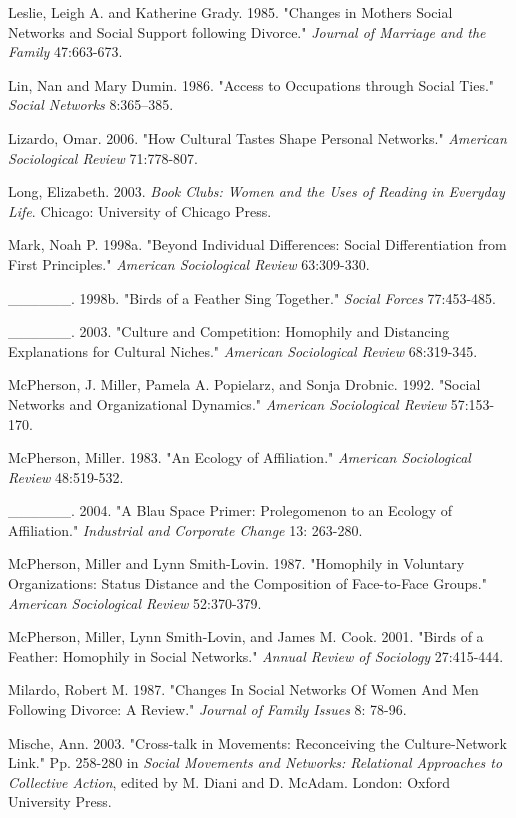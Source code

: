 \documentclass[
]{article}
\begin{document}
Leslie, Leigh A. and Katherine Grady. 1985. "Changes in Mothers\textquotesingle{} Social Networks and Social Support following Divorce." \emph{Journal of Marriage and the Family} 47:663-673.

Lin, Nan and Mary Dumin. 1986. "Access to Occupations through Social Ties." \emph{Social Networks} 8:365--385.

Lizardo, Omar. 2006. "How Cultural Tastes Shape Personal Networks." \emph{American Sociological Review} 71:778-807.

Long, Elizabeth. 2003. \emph{Book Clubs: Women and the Uses of Reading in Everyday Life}. Chicago: University of Chicago Press.

Mark, Noah P. 1998a. "Beyond Individual Differences: Social Differentiation from First Principles." \emph{American Sociological Review} 63:309-330.

\_\_\_\_\_\_. 1998b. "Birds of a Feather Sing Together." \emph{Social Forces} 77:453-485.

\_\_\_\_\_\_. 2003. "Culture and Competition: Homophily and Distancing Explanations for Cultural Niches." \emph{American Sociological Review} 68:319-345.

McPherson, J. Miller, Pamela A. Popielarz, and Sonja Drobnic. 1992. "Social Networks and Organizational Dynamics." \emph{American Sociological Review} 57:153-170.

McPherson, Miller. 1983. "An Ecology of Affiliation." \emph{American Sociological Review} 48:519-532.

\_\_\_\_\_\_. 2004. "A Blau Space Primer: Prolegomenon to an Ecology of Affiliation." \emph{Industrial and Corporate Change} 13: 263-280.

McPherson, Miller and Lynn Smith-Lovin. 1987. "Homophily in Voluntary Organizations: Status Distance and the Composition of Face-to-Face Groups." \emph{American Sociological Review} 52:370-379.

McPherson, Miller, Lynn Smith-Lovin, and James M. Cook. 2001. "Birds of a Feather: Homophily in Social Networks." \emph{Annual Review of Sociology} 27:415-444.

Milardo, Robert M. 1987. "Changes In Social Networks Of Women And Men Following Divorce: A Review." \emph{Journal of Family Issues} 8: 78-96.

Mische, Ann. 2003. "Cross-talk in Movements: Reconceiving the Culture-Network Link." Pp. 258-280 in \emph{Social Movements and Networks: Relational Approaches to Collective Action}, edited by M. Diani and D. McAdam. London: Oxford University Press.
\end{document}
